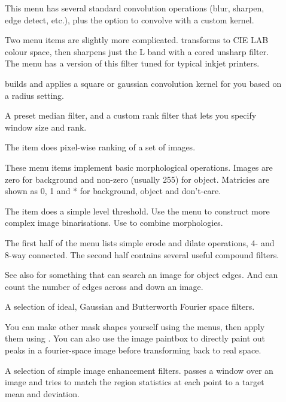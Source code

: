 \begin{description}

\item[]
	This menu has several standard convolution operations (blur, sharpen,
	edge detect, etc.), plus the option to convolve with a custom kernel.

	Two menu items are slightly more complicated. 
	transforms to CIE LAB colour space, then sharpens just the L band
	with a cored unsharp filter. The  menu has a
	version of this filter tuned for typical inkjet printers.

	 builds and applies a square or gaussian convolution
	kernel for you based on a radius setting.

\item[]
	A preset median filter, and a custom rank filter that lets you specify
	window size and rank.

	The  item does pixel-wise ranking of a set of images.

\item[]
	These menu items implement basic morphological operations. Images are
	zero for background and non-zero (usually 255) for object. Matricies
	are shown as 0, 1 and * for background, object and don't-care.

	The  item does a simple level threshold. Use the
	 menu to construct more complex image
	binarisations. Use  to combine morphologies.

	The first half of the menu lists simple erode and dilate operations, 4-
	and 8-way connected. The second half contains several useful compound
	filters.

	See also  for
	something that can search an image for object edges. And
	 can count the number of edges
	across and down an image.

\item[]
	A selection of ideal, Gaussian and Butterworth Fourier space filters.

	You can make other mask shapes yourself using the  menus, then apply them using . You can
	also use the image paintbox to directly paint out peaks in a
	fourier-space image before transforming back to real space.
	
\item[]
	A selection of simple image enhancement filters.  passes a window over an image and tries to match the
	region statistics at each point to a target mean and deviation. 


\end{description}
